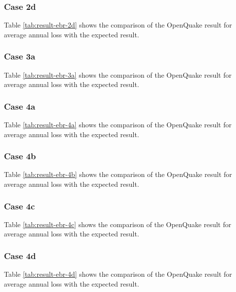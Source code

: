 \subsubsection{Case 2d}


Table \ref{tab:result-ebr-2d} shows the comparison of the OpenQuake result for average annual loss with the expected result.

\subsubsection{Case 3a}


Table \ref{tab:result-ebr-3a} shows the comparison of the OpenQuake result for average annual loss with the expected result.

\subsubsection{Case 4a}


Table \ref{tab:result-ebr-4a} shows the comparison of the OpenQuake result for average annual loss with the expected result.

\subsubsection{Case 4b}


Table \ref{tab:result-ebr-4b} shows the comparison of the OpenQuake result for average annual loss with the expected result.

\subsubsection{Case 4c}


Table \ref{tab:result-ebr-4c} shows the comparison of the OpenQuake result for average annual loss with the expected result.

\subsubsection{Case 4d}


Table \ref{tab:result-ebr-4d} shows the comparison of the OpenQuake result for average annual loss with the expected result.

